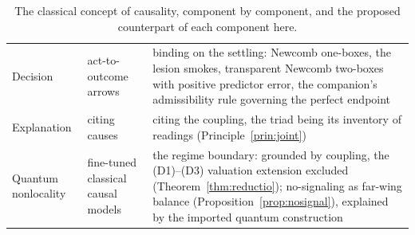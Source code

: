 \documentclass[11pt]{article}
\begin{document}
\begin{table}[!htbp]
\begin{tabular}{p{}p{}p{}}
Decision & act-to-outcome arrows & binding on the settling: Newcomb one-boxes, the lesion smokes, transparent Newcomb two-boxes with positive predictor error, the companion's admissibility rule governing the perfect endpoint \cite{AethusDecision} \\
Explanation & citing causes & citing the coupling, the triad being its inventory of readings (Principle~\ref{prin:joint}) \\
Quantum nonlocality & fine-tuned classical causal models \cite{wood_spekkens_2015} & the regime boundary: grounded by coupling, the (D1)--(D3) valuation extension excluded (Theorem~\ref{thm:reductio}); no-signaling as far-wing balance (Proposition~\ref{prop:nosignal}), explained by the imported quantum construction \cite{AethusQuant} \\
\hline
\end{tabular}
\caption{The classical concept of causality, component by component, and the proposed counterpart of each component here.}
\label{tab:concept}
\end{table}
\end{document}
